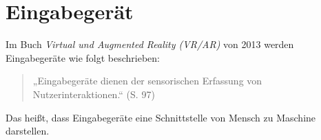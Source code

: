 \section{Eingabegerät}
Im Buch \textit{Virtual und Augmented Reality (VR/AR)} von 2013 werden Eingabegeräte wie folgt beschrieben:

\begin{quote}
    „Eingabegeräte dienen der sensorischen Erfassung von Nutzerinteraktionen.“ (S. 97)\cite{doernerVirtualUndAugmented2013}
\end{quote}

Das heißt, dass Eingabegeräte eine Schnittstelle von Mensch zu Maschine darstellen.